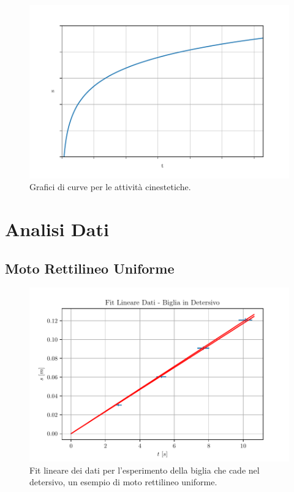 \documentclass{report} \usepackage[T1]{fontenc} \usepackage[italian]{babel}
\begin{document}
\begin{figure}[H]
\centering
  \includegraphics[width=\textwidth]{kine_plot5}
  \caption{Grafici di curve per le attività
           cinestetiche.}
  \label{fig:kine_plot5}
\end{figure}

\chapter{Analisi Dati}\label{appendix_data_analysis}
\section{Moto Rettilineo Uniforme}

\begin{figure}[H]
\centering
  \includegraphics[width=\textwidth]{fit_marble}
  \caption{Fit lineare dei dati per l'esperimento della biglia che cade nel detersivo,
           un esempio di moto rettilineo uniforme.}
  \label{fig:fit_marble}
\end{figure}
\end{document}
